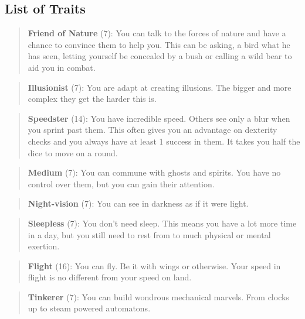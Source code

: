 \documentclass[11pt]{article}
\begin{document}
{\subsection{List of Traits}
\label{sec:orga817fd6}
\begin{quote}
\textbf{Friend of Nature} (7): You can talk to the forces of nature and have a chance to convince them to help you. This can be asking, a bird what he has seen, letting yourself be concealed by a bush or calling a wild bear to aid you in combat.
\end{quote}

\begin{quote}
\textbf{Illusionist} (7): You are adapt at creating illusions. The bigger and more complex they get the harder this is.
\end{quote}

\begin{quote}
\textbf{Speedster} (14): You have incredible speed. Others see only a blur when you sprint past them. This often gives you an advantage on dexterity checks and you always have at least 1 success in them. It takes you half the dice to move on a round.
\end{quote}

\begin{quote}
\textbf{Medium} (7): You can commune with ghosts and spirits. You have no control over them, but you can gain their attention.
\end{quote}

\begin{quote}
\textbf{Night-vision} (7): You can see in darkness as if it were light.
\end{quote}

\begin{quote}
\textbf{Sleepless} (7): You don't need sleep. This means you have a lot more time in a day, but you still need to rest from to much physical or mental exertion.
\end{quote}

\begin{quote}
\textbf{Flight} (16): You can fly. Be it with wings or otherwise. Your speed in flight is no different from your speed on land.
\end{quote}

\begin{quote}
\textbf{Tinkerer} (7): You can build wondrous mechanical marvels. From clocks up to steam powered automatons. 
\end{quote}

}
\end{document}
